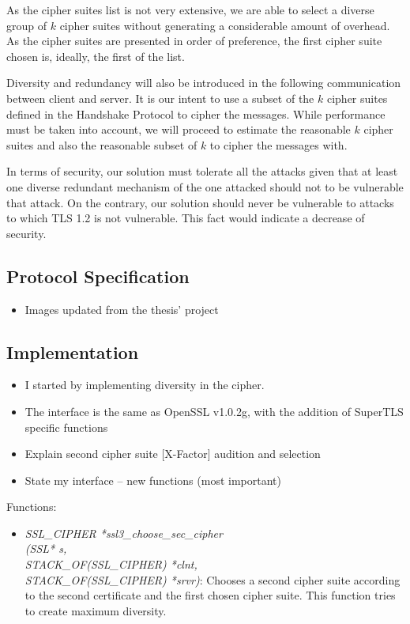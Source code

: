 \documentclass{sig-alternate-05-2015}
\begin{document}
As the cipher suites list is not very extensive, we are able to select a diverse group of $k$ cipher suites without generating a considerable amount of overhead. As the cipher suites are presented in order of preference, the first cipher suite chosen is, ideally, the first of the list.

Diversity and redundancy will also be introduced in the following communication between client and server. It is our intent to use a subset of the $k$ cipher suites defined in the Handshake Protocol to cipher the messages. While performance must be taken into account, we will proceed to estimate the reasonable $k$ cipher suites and also the reasonable subset of $k$ to cipher the messages with.

In terms of security, our solution must tolerate all the attacks given that at least one diverse redundant mechanism of the one attacked should not to be vulnerable that attack. On the contrary, our solution should never be vulnerable to attacks to which TLS 1.2 is not vulnerable. This fact would indicate a decrease of security.

\subsection{Protocol Specification}

\begin{itemize}
\item Images updated from the thesis' project
\end{itemize}

\subsection{Implementation}

\begin{itemize}
\item I started by implementing diversity in the cipher.
\item The interface is the same as OpenSSL v1.0.2g, with the addition of SuperTLS specific functions
\item Explain second cipher suite [X-Factor] audition and selection
\item State my interface -- new functions (most important)
\end{itemize}

Functions:
\begin{itemize}
	\item{\textit{SSL\_CIPHER *ssl3\_choose\_sec\_cipher \\(SSL* s,\\ STACK\_OF(SSL\_CIPHER) *clnt,\\ STACK\_OF(SSL\_CIPHER) *srvr)}: Chooses a second cipher suite according to the second certificate and the first chosen cipher suite. This function tries to create maximum diversity.}
\end{itemize}
\end{document}
